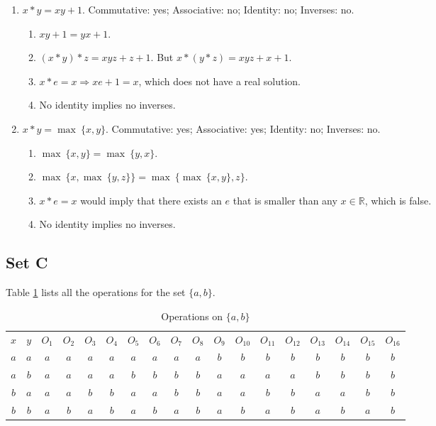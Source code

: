 \documentclass{article}
\begin{document}
\begin{enumerate}
\item $x * y = xy + 1$. Commutative: yes; Associative: no; Identity: no; Inverses: no.
\begin{enumerate}[label=(\roman*)]
    \item $xy + 1 = yx + 1$.
    \item $(x * y) * z = xyz + z + 1$. But $x * (y * z) = xyz + x + 1$.
    \item $x * e = x \Rightarrow xe + 1 = x$, which does not have a real solution.
    \item No identity implies no inverses.
\end{enumerate}

\item $x * y = \max\ \{x, y\}$. Commutative: yes; Associative: yes; Identity: no; Inverses: no.
\begin{enumerate}[label=(\roman*)]
    \item $\max\ \{x, y\} = \max\ \{y, x\}$.
    \item $\max\ \{x, \max\ \{y, z\}\} = \max\ \{\max\ \{x, y\}, z\}$.
    \item $x * e = x$ would imply that there exists an $e$ that is smaller than any $x \in \mathbb{R}$, which is false.
    \item No identity implies no inverses.
\end{enumerate}
\end{enumerate}

\subsection{Set C}
Table \ref{tab:binary-operations} lists all the operations for the set $\{a, b\}$. 

\begin{table}[]
    \centering         
    \begin{tabular}{cc|cccccccccccccccc}
    $x$ & $y$ & $O_1$ & $O_2$ & $O_3$ & $O_4$ & $O_5$ & $O_6$ & $O_7$ & $O_8$ & $O_9$ & $O_{10}$ & $O_{11}$ & $O_{12}$ & $O_{13}$ & $O_{14}$ & $O_{15}$ & $O_{16}$ \\
    $a$ & $a$ & $a$     & $a$     & $a$     & $a$     & $a$     & $a$     & $a$     & $a$     & $b$     & $b$      & $b$      & $b$      & $b$      & $b$      & $b$      & $b$      \\
    $a$ & $b$ & $a$     & $a$     & $a$     & $a$     & $b$     & $b$     & $b$     & $b$     & $a$     & $a$      & $a$      & $a$      & $b$      & $b$      & $b$      & $b$      \\
    $b$ & $a$ & $a$     & $a$     & $b$     & $b$     & $a$     & $a$     & $b$     & $b$     & $a$     & $a$      & $b$      & $b$      & $a$      & $a$      & $b$      & $b$      \\
    $b$ & $b$ & $a$     & $b$     & $a$     & $b$     & $a$     & $b$     & $a$     & $b$     & $a$     & $b$      & $a$      & $b$      & $a$      & $b$      & $a$      & $b$     
    \end{tabular}
    \caption{Operations on $\{a, b\}$}
    \label{tab:binary-operations}
\end{table}
\end{document}

